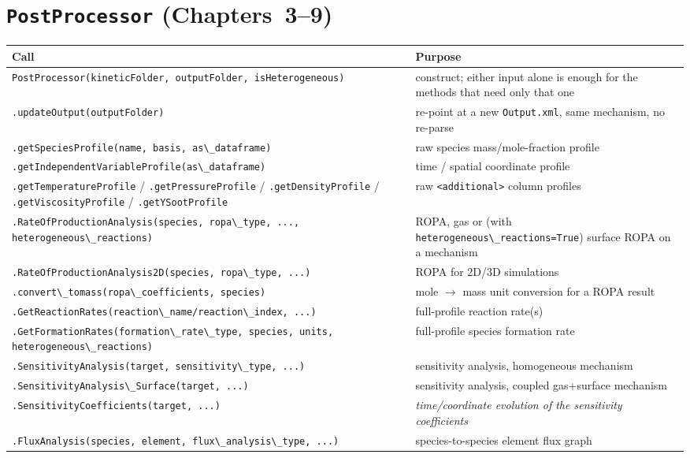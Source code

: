 \documentclass[11pt,a4paper]{report}
\newcommand{\pkg}[1]{\lstinline|#1|}
\begin{document}
\section{\texttt{PostProcessor} (Chapters~3--9)}
\begin{center}
\small
\begin{longtable}{p{6.6cm}p{9cm}}
\toprule
\textbf{Call} & \textbf{Purpose} \\
\midrule
\endhead
\pkg{PostProcessor(kineticFolder, outputFolder, isHeterogeneous)} & construct; either input alone is enough for the methods that need only that one \\
\pkg{.updateOutput(outputFolder)} & re-point at a new \pkg{Output.xml}, same mechanism, no re-parse \\
\pkg{.getSpeciesProfile(name, basis, as\_dataframe)} & raw species mass/mole-fraction profile \\
\pkg{.getIndependentVariableProfile(as\_dataframe)} & time / spatial coordinate profile \\
\pkg{.getTemperatureProfile} / \pkg{.getPressureProfile} / \pkg{.getDensityProfile} / \pkg{.getViscosityProfile} / \pkg{.getYSootProfile} & raw \pkg{<additional>} column profiles \\
\pkg{.RateOfProductionAnalysis(species, ropa\_type, ..., heterogeneous\_reactions)} & ROPA, gas or (with \pkg{heterogeneous\_reactions=True}) surface ROPA on a mechanism \\
\pkg{.RateOfProductionAnalysis2D(species, ropa\_type, ...)} & ROPA for 2D/3D simulations \\
\pkg{.convert\_tomass(ropa\_coefficients, species)} & mole $\to$ mass unit conversion for a ROPA result \\
\pkg{.GetReactionRates(reaction\_name/reaction\_index, ...)} & full-profile reaction rate(s) \\
\pkg{.GetFormationRates(formation\_rate\_type, species, units, heterogeneous\_reactions)} & full-profile species formation rate \\
\pkg{.SensitivityAnalysis(target, sensitivity\_type, ...)} & sensitivity analysis, homogeneous mechanism \\
\pkg{.SensitivityAnalysis\_Surface(target, ...)} & sensitivity analysis, coupled gas+surface mechanism \\
\pkg{.SensitivityCoefficients(target, ...)} & \textit{time/coordinate evolution of the sensitivity coefficients} \\
\pkg{.FluxAnalysis(species, element, flux\_analysis\_type, ...)} & species-to-species element flux graph \\

\end{longtable}
\end{center}
\end{document}
